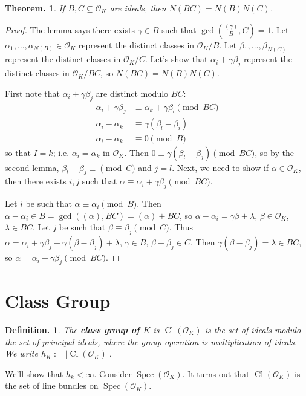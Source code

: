 \documentclass[11pt, a4paper]{memoir}
\theoremstyle{change}
\newtheorem{theorem}{Theorem.}[section]
\theoremstyle{plain}
\theoremstyle{nonumberplain}
\newtheorem{definition}{Definition.}
\newtheorem{proof}{Proof}
\DeclareMathOperator{\Spec}{Spec}
\DeclareMathOperator{\Cl}{Cl}
\newcommand{\mbf}[1]{{\boldmath\bfseries #1}}
\numberwithin{equation}{section}
\begin{document}
\begin{theorem}
    If $B,C\subseteq\mathcal{O}_K$ are ideals, then $N(BC)=N(B)N(C)$.
\end{theorem}
\begin{proof}
    The lemma says there exists $\gamma\in B$ such that $\gcd\left(\frac{(\gamma)}{B},C\right)=1$.
    Let $\alpha_1,\ldots,\alpha_{N(B)}\in\mathcal{O}_K$ represent the distinct classes in $\mathcal{O}_K/B$.
    Let $\beta_1,\ldots,\beta_{N(C)}$ represent the distinct classes in $\mathcal{O}_K/C$.
    Let's show that $\alpha_i+\gamma\beta_j$ represent the distinct classes in $\mathcal{O}_K/BC$, so $N(BC)=N(B)N(C)$.

    First note that $\alpha_i+\gamma\beta_j$ are distinct modulo $BC$:
    \begin{align*}
        \alpha_i+\gamma\beta_j &\equiv\alpha_k+\gamma\beta_l\pmod{BC}\\
        \alpha_i-\alpha_k &\equiv\gamma(\beta_l-\beta_i)\\
        \alpha_i-\alpha_k &\equiv 0\pmod{B}
    \end{align*}
    so that $I=k$; i.e. $\alpha_i=\alpha_k$ in $\mathcal{O}_K$.
    Then $0\equiv\gamma(\beta_l-\beta_j)\pmod{BC}$, so by the second lemma, $\beta_l-\beta_j\equiv \pmod{C}$ and $j=l$.
    Next, we need to show if $\alpha\in\mathcal{O}_K$, then there exists $i,j$ such that $\alpha\equiv\alpha_i+\gamma\beta_j\pmod{BC}$.

    Let $i$ be such that $\alpha\equiv\alpha_i\pmod{B}$.
    Then $\alpha-\alpha_i\in B=\gcd((\alpha),BC)=(\alpha)+BC$, so $\alpha-\alpha_i=\gamma\beta+\lambda$, $\beta\in\mathcal{O}_K$, $\lambda\in BC$.
    Let $j$ be such that $\beta\equiv\beta_j\pmod{C}$.
    Thus $\alpha=\alpha_i+\gamma\beta_j+\gamma(\beta-\beta_j)+\lambda$, $\gamma\in B$, $\beta-\beta_j\in C$.
    Then $\gamma(\beta-\beta_j)=\lambda\in BC$, so $\alpha=\alpha_i+\gamma\beta_j\pmod{BC}$.
\end{proof}
\section{Class Group}
\begin{definition}
    The \mbf{class group of $K$} is $\Cl(\mathcal{O}_K)$ is the set of ideals modulo the set of principal ideals, where the group operation is multiplication of ideals.
    We write $h_K:=|\Cl(\mathcal{O}_K)|$.
\end{definition}
We'll show that $h_k<\infty$.
Consider $\Spec(\mathcal{O}_K)$.
It turns out that $\Cl(\mathcal{O}_K)$ is the set of line bundles on $\Spec(\mathcal{O}_K)$.
\end{document}
